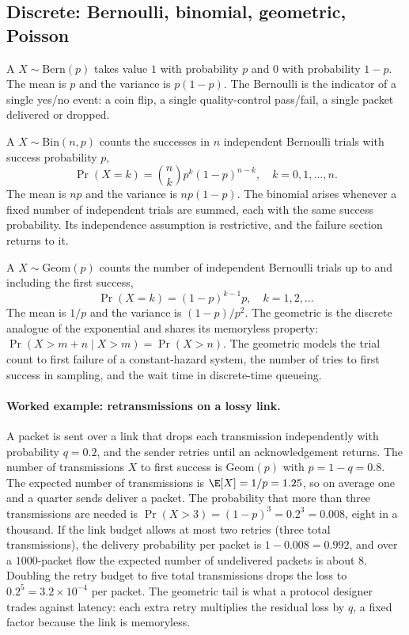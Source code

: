 \subsection{Discrete: Bernoulli, binomial, geometric, Poisson}

A  $X \sim \mathrm{Bern}(p)$
takes value $1$ with probability $p$ and $0$ with probability
$1 - p$. The mean is $p$ and the variance is $p(1 - p)$. The
Bernoulli is the indicator of a single yes/no event: a coin flip,
a single quality-control pass/fail, a single packet delivered or
dropped.

A  $X \sim \mathrm{Bin}(n, p)$
counts the successes in $n$ independent Bernoulli trials with
success probability $p$,
\[
\Pr(X = k) = \binom{n}{k} p^{k} (1 - p)^{n - k},
\quad k = 0, 1, \ldots, n.
\]
The mean is $np$ and the variance is $np(1 - p)$. The binomial
arises whenever a fixed number of independent trials are summed,
each with the same success probability. Its independence assumption
is restrictive, and the failure section returns to it.

A  $X \sim \mathrm{Geom}(p)$
counts the number of independent Bernoulli trials up to and
including the first success,
\[
\Pr(X = k) = (1 - p)^{k - 1} p, \quad k = 1, 2, \ldots
\]
The mean is $1/p$ and the variance is $(1 - p)/p^{2}$. The
geometric is the discrete analogue of the exponential and shares
its memoryless property: $\Pr(X > m + n \mid X > m) = \Pr(X > n)$.
The geometric models the trial count to first failure of a
constant-hazard system, the number of tries to first success in
sampling, and the wait time in discrete-time queueing.

\paragraph{Worked example: retransmissions on a lossy link.} A
packet is sent over a link that drops each transmission
independently with probability $q = 0.2$, and the sender retries
until an acknowledgement returns. The number of transmissions $X$
to first success is $\mathrm{Geom}(p)$ with $p = 1 - q = 0.8$. The
expected number of transmissions is $\E[X] = 1/p = 1.25$, so on
average one and a quarter sends deliver a packet. The probability
that more than three transmissions are needed is $\Pr(X > 3) =
(1 - p)^{3} = 0.2^{3} = 0.008$, eight in a thousand. If the link
budget allows at most two retries (three total transmissions), the
delivery probability per packet is $1 - 0.008 = 0.992$, and over a
$1000$-packet flow the expected number of undelivered packets is
about $8$. Doubling the retry budget to five total transmissions
drops the loss to $0.2^{5} = 3.2 \times 10^{-4}$ per packet. The
geometric tail is what a protocol designer trades against latency:
each extra retry multiplies the residual loss by $q$, a fixed factor
because the link is memoryless.

